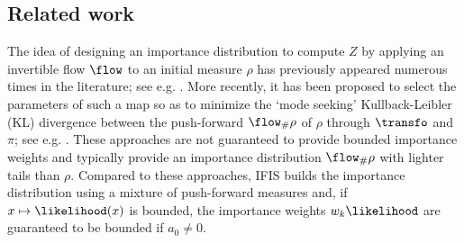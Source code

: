 


\subsection{Related work}\label{subsec:relatedwork}
The idea of designing an importance distribution to compute $Z$ by applying an invertible flow $\flow$ to an initial measure $\rho$ has previously appeared  numerous times in the literature; see e.g. \cite{cuendet2006statistical,jarzynski2002targeted,meng2002warp,neal2005hamiltonian,procacci2006crooks}. More recently, it has been proposed to select the parameters of such a map so as to minimize the `mode seeking' Kullback-Leibler (KL) divergence between the push-forward $\flow_{\#}\rho$ of $\rho$ through $\transfo$ and $\pi$; see e.g. \cite{ el2012bayesian,muller2018neural,papamakarios2019normalizing,prangle2019distilling,wirnsberger2020targeted}. These approaches are not guaranteed to provide bounded importance weights and typically provide an importance distribution $\flow_{\#}\rho$ with lighter tails than $\rho$.
Compared to these approaches, IFIS builds the importance distribution using a mixture of push-forward measures and, if $x\mapsto \likelihood(x)$ is bounded, the importance weights $w_k \likelihood$ are guaranteed to be bounded if $a_0\neq 0$.
